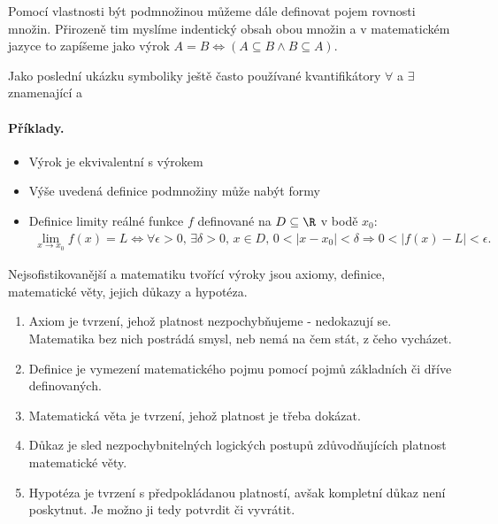 \documentclass[11pt,a4paper]{article}
\begin{document}
            Pomocí vlastnosti být podmnožinou můžeme dále definovat pojem rovnosti množin. Přirozeně tim myslíme indentický obsah obou množin a v matematickém jazyce to zapíšeme jako výrok $A = B \iff (A \subseteq B \wedge B \subseteq A)$.

            Jako poslední ukázku symboliky ještě často používané kvantifikátory $\forall$ a $\exists$ znamenající  a 
            \paragraph*{Příklady.}
            \begin{itemize}
                \item Výrok  je ekvivalentní s výrokem 
                \item Výše uvedená definice podmnožiny může nabýt formy 
                \item Definice limity reálné funkce $f$ definované na $D \subseteq \R$ v bodě $x_0$:
                \begin{align*}
                    \lim_{x \to x_0} f(x) = L \iff \forall \epsilon > 0, \, \exists \delta > 0, \, x \in D, \, 0 < |x-x_0| < \delta \Rightarrow 0 < |f(x) - L| < \epsilon.
                \end{align*}
            \end{itemize}

            Nejsofistikovanější a matematiku tvořící výroky jsou axiomy, definice, matematické věty, jejich důkazy a hypotéza.
            \begin{enumerate}[label=(\alph*)]
                \item Axiom je tvrzení, jehož platnost nezpochybňujeme - nedokazují se. Matematika bez nich postrádá smysl, neb nemá na čem stát, z čeho vycházet.
                \item Definice je vymezení matematického pojmu pomocí pojmů základních či dříve definovaných.
                \item Matematická věta je tvrzení, jehož platnost je třeba dokázat.
                \item Důkaz je sled nezpochybnitelných logických postupů zdůvodňujících platnost matematické věty.
                \item Hypotéza je tvrzení s předpokládanou platností, avšak kompletní důkaz není poskytnut. Je možno ji tedy potvrdit či vyvrátit.
            \end{enumerate}
\end{document}
